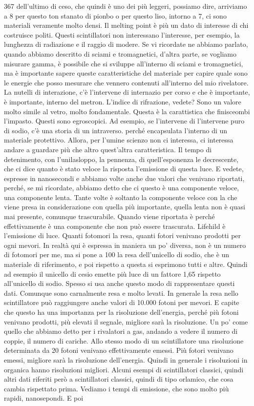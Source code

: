 367 dell'ultimo di ceso, che quindi è uno dei più leggeri, possiamo dire, arriviamo a 8 per questo ton stanato di pionbo o per questo liso, intorno a 7, ci sono materiali veramente molto densi. Il melting point è più un dato di interesse di chi costruisce politi. Questi scintillatori non interessano l'interesse, per esempio, la lunghezza di radiazione e il raggio di modere. Se vi ricordate ne abbiamo parlato, quando abbiamo descritto di sciami e tromagnetici, d'altra parte, se vogliamo misurare gamma, è possibile che si sviluppe all'interno di sciami e tromagnetici, ma è importante sapere queste caratteristiche del materiale per capire quale sono le energie che posso mesurare che vennero contenuti all'interno del mio rivelatore. La nutelli di interazione, c'è l'intervene di internazio per corso e che è importante, è importante, interno del metron. L'indice di rifrazione, vedete? Sono un valore molto simile al vetro, molto fondamentale. Questa è la carattistica che finisceombi l'impasto. Questi sono egroscopici. Ad esempio, se l'intervene di l'intervene puro di sodio, c'è una storia di un intraverso. perché encapsulata l'interno di un materiale protettivo. Allora, per l'umine scienzo non ci interessa, ci interessa andare a guardare più che altro quest'altra caratteristica. Il tempo di detenimento, con l'unilasloppo, la pennenza, di quell'esponenza le decrescente, che ci dice quanto è stato veloce la risposta l'emissione di questa luce. E vedete, espresse in nanosecondi e abbiamo volte anche due valori che venivano riportati, perché, se mi ricordate, abbiamo detto che ci questo è una componente veloce, una componente lenta. Tante volte è soltanto la componente veloce con la che viene presa in considerazione con quella più importante, quella lenta non è quasi mai presente, comunque trascurabile. Quando viene riportata è perché effettivamente è una componente che non può essere trascurata. Lifehild è l'emissione di luce. Quanti fotomori la resa, quanti fotori venivano prodotti per ogni mevori. In realtà qui è espressa in maniera un po' diversa, non è un numero di fotomori per me, ma si pone a 100 la resa dell'unicello di sodio, che è un materiale di riferimento, e poi rispetto a questa si esprimono tutti e altre. Quindi ad esempio il unicello di cesio emette più luce di un fattore 1,65 rispetto all'unicello di sodio. Spesso si usa anche questo modo di rappresentare questi dati. Comunque sono carnalmente resa e molto levati. In generale la resa nello scintillatore può raggiungere anche valori di 10.000 fotoni per mevori. E capite che questo ha una importanza per la risoluzione dell'energia, perché più fotoni venivano prodotti, più elevati il segnale, migliore sarà la risoluzione. Un po' come quello che abbiamo detto per i rivalatori a gas, andando a vedere il numero di coppie, il numero di cariche. Allo stesso modo di un scintillatore una risoluzione determinata da 20 fotoni venivano effettivamente emessi. Più fotori venivano emessi, migliore sarà la risoluzione dell'energia. Quindi in generale i risoluzioni in organica hanno risoluzioni migliori. Alcuni esempi di scintillatori classici, quindi altri dati riferiti però a scintillatori classici, quindi di tipo orlamico, che cosa cambia rispettato prima. Vediamo i tempi di emissione, che sono molto più rapidi, nanosepondi. E poi 